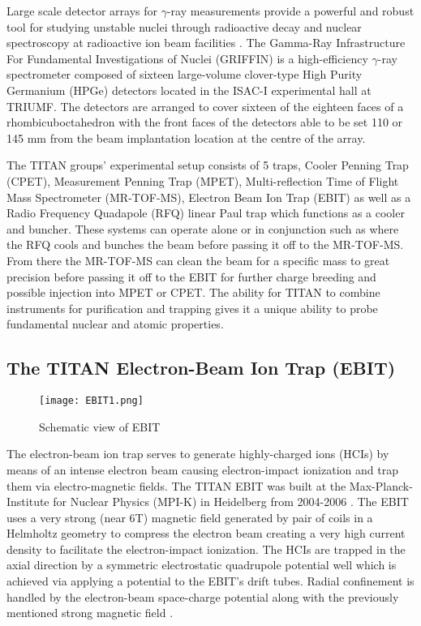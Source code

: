 \documentclass[cnatzke_thesis_proposal.tex]{subfiles}
\begin{document}
Large scale detector arrays for $\gamma$-ray measurements provide a powerful and robust tool for studying unstable nuclei through radioactive decay and nuclear spectroscopy at radioactive ion beam facilities \cite{garnsworthy_griffin_2019}. 
The Gamma-Ray Infrastructure For Fundamental Investigations of Nuclei (GRIFFIN) is a high-efficiency $\gamma$-ray spectrometer composed of sixteen large-volume clover-type High Purity Germanium (HPGe) detectors located in the ISAC-I experimental hall at TRIUMF. 
The detectors are arranged to cover sixteen of the eighteen faces of a rhombicuboctahedron with the front faces of the detectors able to be set 110 or 145 mm from the beam implantation location at the centre of the array. 


The TITAN groups' experimental setup consists of 5 traps, Cooler Penning Trap (CPET), Measurement Penning Trap (MPET), Multi-reflection Time of Flight Mass Spectrometer (MR-TOF-MS), Electron Beam Ion Trap (EBIT) as well as a Radio Frequency Quadapole (RFQ) linear Paul trap which functions as a cooler and buncher.  
These systems can operate alone or in conjunction such as where the RFQ cools and bunches the beam before passing it off to the MR-TOF-MS.  
From there the MR-TOF-MS can clean the beam for a specific mass to great precision before passing it off to the EBIT for further charge breeding and possible injection into MPET or CPET.  
The ability for TITAN to combine instruments for purification and trapping gives it a unique ability to probe fundamental nuclear and atomic properties.

\subsection{The TITAN Electron-Beam Ion Trap (EBIT)}

\begin{figure}[H]
  \begin{center}
    \texttt{[image: EBIT1.png]}
  \end{center}
  \caption{Schematic view of EBIT}
  \label{fig:EBIT_CUTOUT}
\end{figure}

The electron-beam ion trap serves to generate highly-charged ions (HCIs) by means of an intense electron beam causing electron-impact ionization and trap them via electro-magnetic fields.  
The TITAN EBIT was built at the Max-Planck-Institute for Nuclear Physics (MPI-K) in Heidelberg from 2004-2006 \cite{TITAN_EBIT_2010}. 
The EBIT uses a very strong (near 6T) magnetic field generated by pair of coils in a Helmholtz geometry to compress the electron beam creating a very high current density to facilitate the electron-impact ionization.  
The HCIs are trapped in the axial direction by a symmetric electrostatic quadrupole potential well which is achieved via applying a potential to the EBIT's drift tubes.  
Radial confinement is handled by the electron-beam space-charge potential along with the previously mentioned strong magnetic field \cite{TITAN_EBIT_2010}.
\end{document}
